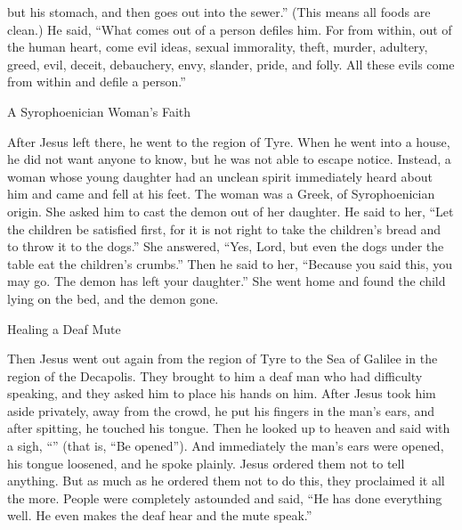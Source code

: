 {but
his stomach,
and
then goes out
into
the sewer.”
(This means all
foods
are clean.)
He
said,
“What comes out
of
a person
defiles
him.
For
from
within, out of
the human
heart,
come
evil
ideas,
sexual immorality,
theft,
murder,
adultery,
greed,
evil,
deceit,
debauchery,
envy,
slander,
pride,
and folly.
All
these
evils
come
from within
and
defile
a person.”
\par }{\SH A Syrophoenician Woman’s Faith
\par }{\PP {}After
Jesus left
there, he went
to
the region
of Tyre.
When he went
into
a house,
he did
not
want
anyone
to know,
but
he was
not
able
to escape notice.
Instead,
a woman
whose young daughter
had
an unclean
spirit
immediately
heard
about
him
and came
and fell
at
his
feet.
The woman
was
a Greek,
of Syrophoenician
origin.
She asked
him
to
cast
the demon
out of
her
daughter.
He
said
to her,
“Let
the children
be satisfied
first,
for
it is
not
right
to take
the children’s
bread
and
to throw
it to the dogs.”
She answered,
“Yes,
Lord,
but
even the dogs
under
the table
eat
the children’s
crumbs.”
Then
he said
to her,
“Because
you said
this,
you may go.
The demon
has left
your
daughter.”
She went
home
and found
the child
lying
on
the bed,
and
the demon
gone.
\par }{\SH Healing a Deaf Mute
\par }{\PP {}Then
Jesus went out
again
from
the region
of Tyre
to
the Sea
of Galilee
in
the region
of the Decapolis.
They brought
to him
a deaf
man who had difficulty speaking,
and
they asked
him
to
place
his hands
on him.
After
Jesus took
him
aside
privately,
away
from
the crowd,
he put
his
fingers
in
the man’s
ears,
and
after spitting,
he touched
his
tongue.
Then
he looked up
to
heaven
and
said
with a sigh, “{}”
(that
is,
“Be opened”).
And
immediately the man’s
ears
were opened,
his
tongue
loosened,
and
he spoke
plainly.
Jesus ordered
them
not
to
tell
anything.
But
as much as
he ordered
them
not to do this, they proclaimed
it all the more.
People were
completely
astounded
and said,
“He has done
everything
well.
He even makes
the deaf
hear
and
the mute
speak.”

}
